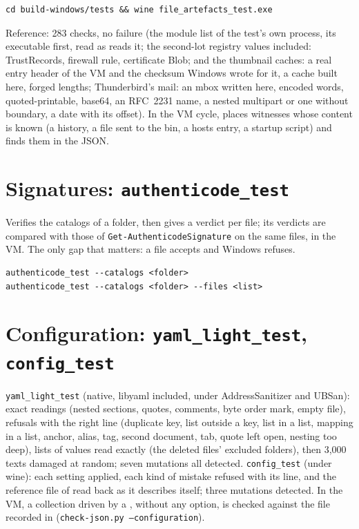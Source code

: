 \documentclass[11pt,a4paper,oneside]{report}
\begin{document}
\begin{lstlisting}
cd build-windows/tests && wine file_artefacts_test.exe
\end{lstlisting}

Reference: 283 checks, no failure (the module list of the test's own
process, its executable first, read as \wac{} reads it; the second-lot registry values included: TrustRecords, firewall rule, certificate Blob; and the thumbnail caches: a real entry header of the VM and the checksum Windows wrote for it, a cache built here, forged lengths; Thunderbird's mail: an mbox written here, encoded words, quoted-printable, base64, an RFC~2231 name, a nested multipart or one without boundary, a date with its offset). In the VM cycle,
 places witnesses whose content is known (a
history, a file sent to the bin, a hosts entry, a startup script) and
 finds them in the JSON.

\section{Signatures: \texttt{authenticode\_test}}

Verifies the catalogs of a folder, then gives a verdict per file; its verdicts
are compared with those of \texttt{Get-AuthenticodeSignature} on the same files,
in the VM. The only gap that matters: a file \wac{} accepts and Windows refuses.

\begin{lstlisting}
authenticode_test --catalogs <folder>
authenticode_test --catalogs <folder> --files <list>
\end{lstlisting}

\section{Configuration: \texttt{yaml\_light\_test}, \texttt{config\_test}}

\texttt{yaml\_light\_test} (native, libyaml included, under AddressSanitizer
and UBSan): exact readings (nested sections, quotes, comments, byte order
mark, empty file), refusals with the right line (duplicate key, list outside
a key, list in a list, mapping in a list, anchor, alias, tag, second
document, tab, quote left open, nesting too deep), lists of values read
exactly (the deleted files' excluded folders), then 3,000 texts damaged at
random; seven mutations all detected.
\texttt{config\_test} (under wine): each setting applied, each kind of mistake
refused with its line, and the reference file of  read back
as it describes itself; three mutations detected. In the VM, a collection
driven by a , without any option, is checked against the file
recorded in  (\texttt{check-json.py
--configuration}).
\end{document}
